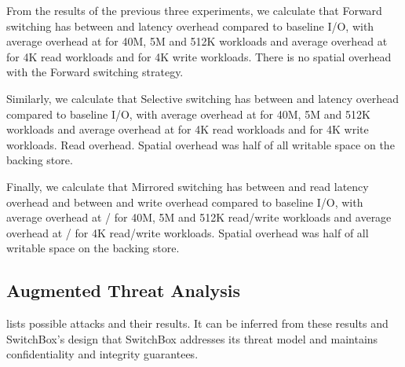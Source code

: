 From the results of the previous three experiments, we calculate that Forward
switching has between  and  latency overhead compared to
baseline I/O, with average overhead at  for 40M, 5M and 512K workloads
and average overhead at  for 4K read workloads and  for 4K
write workloads. There is no spatial overhead with the Forward switching
strategy.

Similarly, we calculate that Selective switching has between  and
 latency overhead compared to baseline I/O, with average overhead at
 for 40M, 5M and 512K workloads and average overhead at  for
4K read workloads and  for 4K write workloads. Read overhead. Spatial
overhead was half of all writable space on the backing store.

Finally, we calculate that Mirrored switching has between  and 
read latency overhead and between  and  write overhead compared
to baseline I/O, with average overhead at / for 40M, 5M and
512K read/write workloads and average overhead at / for 4K
read/write workloads. Spatial overhead was half of all writable space on the
backing store.

\subsection{Augmented Threat Analysis}

 lists possible attacks and their results. It can be inferred
from these results and SwitchBox's design that SwitchBox addresses its threat
model and maintains confidentiality and integrity guarantees.


